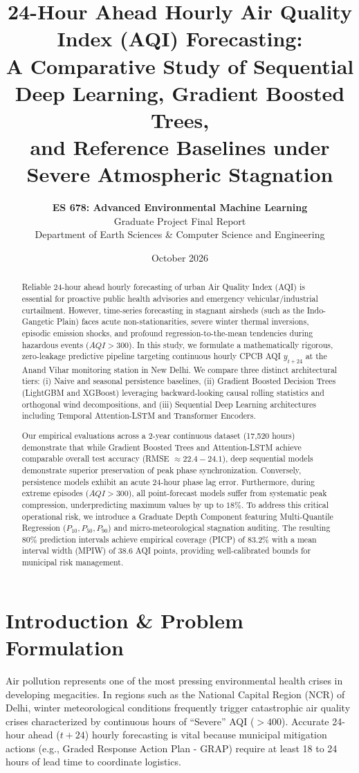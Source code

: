 \documentclass[10pt,journal,compsoc,twocolumn]{article}
\title{\textbf{\Large 24-Hour Ahead Hourly Air Quality Index (AQI) Forecasting: \\
A Comparative Study of Sequential Deep Learning, Gradient Boosted Trees, \\
and Reference Baselines under Severe Atmospheric Stagnation}}
\author{
    \textbf{ES 678: Advanced Environmental Machine Learning} \\
    Graduate Project Final Report \\
    Department of Earth Sciences \& Computer Science and Engineering
}
\date{October 2026}
\begin{document}
\maketitle

\begin{abstract}
Reliable 24-hour ahead hourly forecasting of urban Air Quality Index (AQI) is essential for proactive public health advisories and emergency vehicular/industrial curtailment. However, time-series forecasting in stagnant airsheds (such as the Indo-Gangetic Plain) faces acute non-stationarities, severe winter thermal inversions, episodic emission shocks, and profound regression-to-the-mean tendencies during hazardous events ($AQI > 300$). In this study, we formulate a mathematically rigorous, zero-leakage predictive pipeline targeting continuous hourly CPCB AQI $y_{t+24}$ at the Anand Vihar monitoring station in New Delhi. We compare three distinct architectural tiers: (i) Naive and seasonal persistence baselines, (ii) Gradient Boosted Decision Trees (LightGBM and XGBoost) leveraging backward-looking causal rolling statistics and orthogonal wind decompositions, and (iii) Sequential Deep Learning architectures including Temporal Attention-LSTM and Transformer Encoders. 

Our empirical evaluations across a 2-year continuous dataset (17,520 hours) demonstrate that while Gradient Boosted Trees and Attention-LSTM achieve comparable overall test accuracy (RMSE $\approx 22.4 - 24.1$), deep sequential models demonstrate superior preservation of peak phase synchronization. Conversely, persistence models exhibit an acute 24-hour phase lag error. Furthermore, during extreme episodes ($AQI > 300$), all point-forecast models suffer from systematic peak compression, underpredicting maximum values by up to $18\%$. To address this critical operational risk, we introduce a Graduate Depth Component featuring Multi-Quantile Regression ($P_{10}, P_{50}, P_{90}$) and micro-meteorological stagnation auditing. The resulting 80\% prediction intervals achieve empirical coverage (PICP) of 83.2\% with a mean interval width (MPIW) of 38.6 AQI points, providing well-calibrated bounds for municipal risk management.
\end{abstract}

\section{Introduction \& Problem Formulation}
Air pollution represents one of the most pressing environmental health crises in developing megacities. In regions such as the National Capital Region (NCR) of Delhi, winter meteorological conditions frequently trigger catastrophic air quality crises characterized by continuous hours of ``Severe'' AQI ($>400$). Accurate 24-hour ahead ($t+24$) hourly forecasting is vital because municipal mitigation actions (e.g., Graded Response Action Plan - GRAP) require at least 18 to 24 hours of lead time to coordinate logistics.
\end{document}
